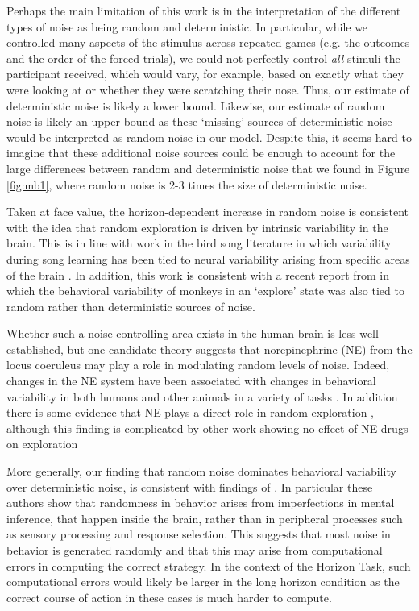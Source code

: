 \documentclass[12pt]{article}
\begin{document}
	Perhaps the main limitation of this work is in the interpretation of the different types of noise as being random and deterministic. In particular, while we controlled many aspects of the stimulus across repeated games (e.g. the outcomes and the order of the forced trials), we could not perfectly control {\it all} stimuli the participant received, which would vary, for example, based on exactly what they were looking at or whether they were scratching their nose. Thus, our estimate of deterministic noise is likely a lower bound. Likewise, our estimate of random noise is likely an upper bound as these `missing' sources of deterministic noise would be interpreted as random noise in our model. Despite this, it seems hard to imagine that these additional noise sources could be enough to account for the large differences between random and deterministic noise that we found in Figure \ref{fig:mb1}, where random noise is 2-3 times the size of deterministic noise.  
	
	Taken at face value, the horizon-dependent increase in random noise is consistent with the idea that random exploration is driven by intrinsic variability in the brain. This is in line with work in the bird song literature in which variability during song learning has been tied to neural variability arising from specific areas of the brain \citep{songbird1, songbird2}. In addition, this work is consistent with a recent report from \cite{ebitz17} in which the behavioral variability of monkeys in an `explore' state was also tied to random rather than deterministic sources of noise. 
	
	Whether such a noise-controlling area exists in the human brain is less well established, but one candidate theory \citep{aj2005} suggests that norepinephrine (NE) from the locus coeruleus may play a role in modulating random levels of noise. Indeed, changes in the NE system have been associated with changes in behavioral variability in both humans and other animals in a variety of tasks \citep{eeKarpova14, eeKeung18}.  In addition there is some evidence that NE plays a direct role in random exploration \citep{eeWarren17}, although this finding is complicated by other work showing no effect of NE drugs on exploration \citep{jepma2012, nieuwenhuis05}
	
	More generally, our finding that random noise dominates behavioral variability over deterministic noise, is consistent with findings of \cite{drugowitsch16}. In particular these authors show that randomness in behavior arises from imperfections in mental inference, that happen inside the brain, rather than in peripheral processes such as sensory processing and response selection. This suggests that most noise in behavior is generated randomly and that this may arise from  computational errors in computing the correct strategy. In the context of the Horizon Task, such computational errors would likely be larger  in the long horizon condition as the correct course of action in these cases is much harder to compute.
	
\end{document}
